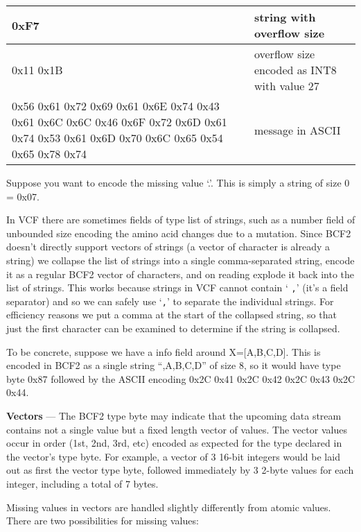 \documentclass[8pt]{article}
\begin{document}
\vspace{0.3cm}
\begin{tabular}{ | p{9cm} | p{6cm} | } \hline
0xF7 & string with overflow size \\ \hline
0x11 0x1B & overflow size encoded as INT8 with value 27 \\ \hline
0x56 0x61 0x72 0x69 0x61 0x6E 0x74 0x43 0x61 0x6C 0x6C 0x46 0x6F 0x72 0x6D 0x61 0x74 0x53 0x61 0x6D 0x70 0x6C 0x65 0x54 0x65 0x78 0x74 & message in ASCII \\ \hline
\end{tabular}
\vspace{0.3cm}

Suppose you want to encode the missing value `.'.  This is simply a string of size 0 = 0x07.

\vspace{0.3cm}
In VCF there are sometimes fields of type list of strings, such as a number field of unbounded size encoding the amino acid changes due to a mutation.  Since BCF2 doesn't directly support vectors of strings (a vector of character is already a string) we collapse the list of strings into a single comma-separated string, encode it as a regular BCF2 vector of characters, and on reading explode it back into the list of strings.  This works because strings in VCF cannot contain `{
\tt ,}' (it's a field separator) and so we can safely use `{\tt ,}' to separate the individual strings.  For efficiency reasons we put a comma at the start of the collapsed string, so that just the first character can be examined to determine if the string is collapsed.

To be concrete, suppose we have a info field around X=[A,B,C,D].  This is encoded in BCF2 as a single string ``,A,B,C,D'' of size 8, so it would have type byte 0x87 followed by the ASCII encoding 0x2C 0x41 0x2C 0x42 0x2C 0x43 0x2C 0x44.

\vspace{0.3cm}

\textbf{Vectors} --- The BCF2 type byte may indicate that the upcoming data stream contains not a single value but a fixed length vector of values.  The vector values occur in order (1st, 2nd, 3rd, etc) encoded as expected for the type declared in the vector's type byte.  For example, a vector of 3 16-bit integers would be laid out as first the vector type byte, followed immediately by 3 2-byte values for each integer, including a total of 7 bytes.

Missing values in vectors are handled slightly differently from atomic values.  There are two possibilities for missing values:
\end{document}
